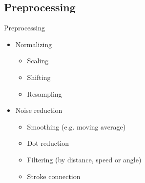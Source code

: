 \subsection{Preprocessing}
\begin{frame}{Preprocessing}
    \begin{itemize}
        \item Normalizing
        \begin{itemize}
            \item Scaling
            \item Shifting
            \item Resampling
        \end{itemize}
        \item Noise reduction
        \begin{itemize}
            \item Smoothing (e.g. moving average)
            \item Dot reduction
            \item Filtering (by distance, speed or angle)
            \item Stroke connection
        \end{itemize}
    \end{itemize}
\end{frame}